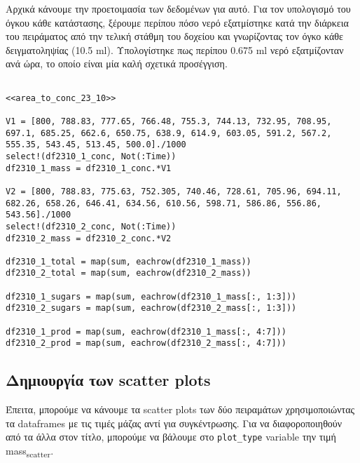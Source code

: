 \documentclass[11pt]{article}
\begin{document}
Αρχικά κάνουμε την προετοιμασία των δεδομένων για αυτό. Για τον υπολογισμό του όγκου κάθε κατάστασης, ξέρουμε περίπου πόσο νερό εξατμίστηκε κατά την διάρκεια του πειράματος από την τελική στάθμη του δοχείου και γνωρίζοντας τον όγκο κάθε δειγματοληψίας (10.5 ml). Υπολογίστηκε πως περίπου 0.675 ml νερό εξατμίζονταν ανά ώρα, το οποίο είναι μία καλή σχετικά προσέγγιση.

\begin{verbatim}

<<area_to_conc_23_10>>

V1 = [800, 788.83, 777.65, 766.48, 755.3, 744.13, 732.95, 708.95, 697.1, 685.25, 662.6, 650.75, 638.9, 614.9, 603.05, 591.2, 567.2, 555.35, 543.45, 513.45, 500.0]./1000
select!(df2310_1_conc, Not(:Time))
df2310_1_mass = df2310_1_conc.*V1

V2 = [800, 788.83, 775.63, 752.305, 740.46, 728.61, 705.96, 694.11, 682.26, 658.26, 646.41, 634.56, 610.56, 598.71, 586.86, 556.86, 543.56]./1000
select!(df2310_2_conc, Not(:Time))
df2310_2_mass = df2310_2_conc.*V2

df2310_1_total = map(sum, eachrow(df2310_1_mass))
df2310_2_total = map(sum, eachrow(df2310_2_mass))

df2310_1_sugars = map(sum, eachrow(df2310_1_mass[:, 1:3]))
df2310_2_sugars = map(sum, eachrow(df2310_2_mass[:, 1:3]))

df2310_1_prod = map(sum, eachrow(df2310_1_mass[:, 4:7]))
df2310_2_prod = map(sum, eachrow(df2310_2_mass[:, 4:7]))

\end{verbatim}

\subsection{Δημιουργία των scatter plots}
\label{sec:orgb3fbb4e}
Έπειτα, μπορούμε να κάνουμε τα scatter plots των δύο πειραμάτων χρησιμοποιώντας τα dataframes με τις τιμές μάζας αντί για συγκέντρωσης. Για να διαφοροποιηθούν από τα άλλα στον τίτλο, μπορούμε να βάλουμε στο \texttt{plot\_type} variable την τιμή mass\textsubscript{scatter}.
\end{document}
